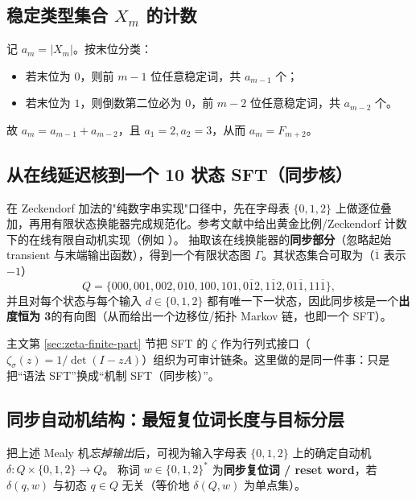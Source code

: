 \subsection{稳定类型集合 \texorpdfstring{$X_m$}{X\_m} 的计数}
\label{subsec:sync-kernel-counting}
记 $a_m=|X_m|$。按末位分类：
\begin{itemize}
  \item 若末位为 $0$，则前 $m-1$ 位任意稳定词，共 $a_{m-1}$ 个；
  \item 若末位为 $1$，则倒数第二位必为 $0$，前 $m-2$ 位任意稳定词，共 $a_{m-2}$ 个。
\end{itemize}
故 $a_m=a_{m-1}+a_{m-2}$，且 $a_1=2,a_2=3$，从而 $a_m=F_{m+2}$。

\subsection{从在线延迟核到一个 10 状态 SFT（同步核）}
在 Zeckendorf 加法的"纯数字串实现"口径中，先在字母表 $\{0,1,2\}$ 上做逐位叠加，再用有限状态换能器完成规范化。参考文献中给出黄金比例/Zeckendorf 计数下的在线有限自动机实现（例如 \cite{Frougny1999OnlineAddition}）。
抽取该在线换能器的\textbf{同步部分}（忽略起始 transient 与末端输出函数），得到一个有限状态图 $\Gamma$。其状态集合可取为（$\overline{1}$ 表示 $-1$）
\[
Q=\{000,001,002,010,100,101,0\overline{1}2,1\overline{1}2,01\overline{1},11\overline{1}\},
\]
并且对每个状态与每个输入 $d\in\{0,1,2\}$ 都有唯一下一状态，因此同步核是一个\textbf{出度恒为 3}的有向图（从而给出一个边移位/拓扑 Markov 链，也即一个 SFT）。






\begin{remark}
主文第 \ref{sec:zeta-finite-part} 节把 SFT 的 \(\zeta\) 作为行列式接口（\(\zeta_\sigma(z)=1/\det(I-zA)\)）组织为可审计链条。这里做的是同一件事：只是把“语法 SFT”换成“机制 SFT（同步核）”。
\end{remark}

\subsection{同步自动机结构：最短复位词长度与目标分层}\label{app:sync-kernel-reset-automaton}
把上述 Mealy 机\emph{忘掉输出}后，可视为输入字母表 $\{0,1,2\}$ 上的确定自动机
\(
\delta:Q\times\{0,1,2\}\to Q
\)。
称词 $w\in\{0,1,2\}^\ast$ 为\textbf{同步复位词 / reset word}，若 $\delta(q,w)$ 与初态 $q\in Q$ 无关（等价地 $\delta(Q,w)$ 为单点集）。

